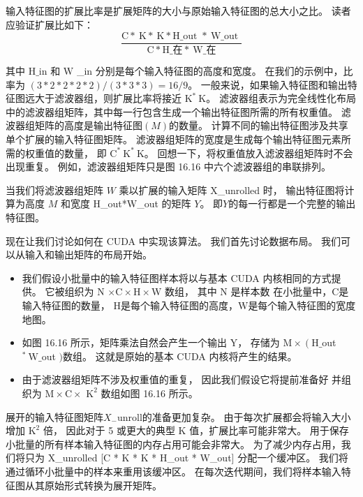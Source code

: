 输入特征图的扩展比率是扩展矩阵的大小与原始输入特征图的总大小之比。 读者应验证扩展比如下：
$$
\frac{\mathrm{C} * \mathrm{~K} * \mathrm{~K} * \mathrm{H} \_ \text {out } * \mathrm{~W} \_ \text {out }} {\mathrm{C} * \mathrm{H} \_ \text {在} * \mathrm{~W} \_ \text {在}}
$$

其中 $\mathrm{H} \_$in 和 $\mathrm{W}$ \_in 分别是每个输入特征图的高度和宽度。 
在我们的示例中，比率为 $(3 * 2 * 2 * 2 * 2) /(3 * 3 * 3)=16 / 9$。 
一般来说，如果输入特征图和输出特征图远大于滤波器组，则扩展比率将接近 $\mathrm{K}^{*} \mathrm{~K}$。 
滤波器组表示为完全线性化布局中的滤波器组矩阵，其中每一行包含生成一个输出特征图所需的所有权重值。 
滤波器组矩阵的高度是输出特征图$(M)$的数量。 计算不同的输出特征图涉及共享单个扩展的输入特征图矩阵。 
滤波器组矩阵的宽度是生成每个输出特征图元素所需的权重值的数量，
即 $\mathrm{C}^{*} \mathrm{~K}^{*} \mathrm{~ K}$。 回想一下，将权重值放入滤波器组矩阵时不会出现重复。 
例如，滤波器组矩阵只是图 16.16 中六个滤波器组的串联排列。

当我们将滤波器组矩阵 $W$ 乘以扩展的输入矩阵 X\_unrolled 时，
输出特征图将计算为高度 $M$ 和宽度 H\_out*W\_out 的矩阵 $Y$。 即$Y$的每一行都是一个完整的输出特征图。

现在让我们讨论如何在 CUDA 中实现该算法。 我们首先讨论数据布局。 
我们可以从输入和输出矩阵的布局开始。
\begin{itemize}
   \item 我们假设小批量中的输入特征图样本将以与基本 CUDA 内核相同的方式提供。 
   	它被组织为 $\mathrm{N}$ $\times \mathrm{C} \times \mathrm{H} \times \mathrm{W}$ 数组，
   	其中 $\mathrm{N}$ 是样本数 在小批量中，$\mathrm{C}$是输入特征图的数量，
   	$\mathrm{H}$是每个输入特征图的高度，$\mathrm{W}$是每个输入特征图的宽度 地图。

   \item 如图 16.16 所示，矩阵乘法自然会产生一个输出 Y，
   	存储为 $\mathrm{M} \times\left(\mathrm{H} \_\right.$out ${ }^{ *} \mathrm{~W} \_$out $)$数组。 
   	这就是原始的基本 CUDA 内核将产生的结果。

   \item 由于滤波器组矩阵不涉及权重值的重复，
   	因此我们假设它将提前准备好
   	并组织为 $\mathrm{M} \times \mathrm{C} \times$ $\mathrm{K }^{2}$ 数组如图 16.16 所示。
\end{itemize}

展开的输入特征图矩阵$X_{-}$unroll的准备更加复杂。 由于每次扩展都会将输入大小增加 $\mathrm{K}^{2}$ 倍，
因此对于 5 或更大的典型 $\mathrm{K}$ 值，扩展比率可能非常大。 用于保存小批量的所有样本输入特征图的内存占用可能会非常大。
为了减少内存占用，我们将只为 X\_unrolled [C * K * K * H\_out * W\_out] 分配一个缓冲区。 
我们将通过循环小批量中的样本来重用该缓冲区。 在每次迭代期间，我们将样本输入特征图从其原始形式转换为展开矩阵。

